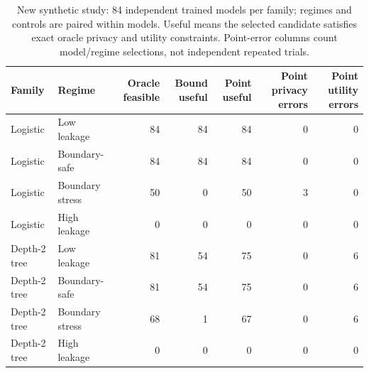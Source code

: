 \begin{table}[t]
\centering\footnotesize
\caption{New synthetic study: 84 independent trained models per family; regimes and controls are paired within models. Useful means the selected candidate satisfies exact oracle privacy and utility constraints. Point-error columns count model/regime selections, not independent repeated trials.}
\label{tab:independent-models}
\begin{tabular}{@{}llrrrrr@{}}
\toprule
Family & Regime & Oracle feasible & Bound useful & Point useful & Point privacy errors & Point utility errors \\
\midrule
Logistic & Low leakage & 84 & 84 & 84 & 0 & 0 \\
Logistic & Boundary-safe & 84 & 84 & 84 & 0 & 0 \\
Logistic & Boundary stress & 50 & 0 & 50 & 3 & 0 \\
Logistic & High leakage & 0 & 0 & 0 & 0 & 0 \\
Depth-2 tree & Low leakage & 81 & 54 & 75 & 0 & 6 \\
Depth-2 tree & Boundary-safe & 81 & 54 & 75 & 0 & 6 \\
Depth-2 tree & Boundary stress & 68 & 1 & 67 & 0 & 6 \\
Depth-2 tree & High leakage & 0 & 0 & 0 & 0 & 0 \\
\bottomrule
\end{tabular}
\end{table}
